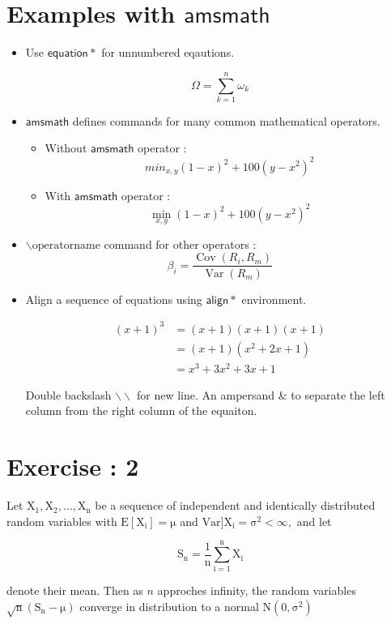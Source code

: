 \documentclass[12pt]{article}
\begin{document}
\section{Examples with $\mathsf{amsmath}$}

\begin{itemize}
\item Use $\mathsf{equation*}$ for unnumbered eqautions.

\begin{equation*}
\Omega = \sum_{k=1}^{n} \omega_k
\end{equation*}

\item $\mathsf{amsmath}$ defines commands for many common mathematical operators.
\begin{itemize}
\item Without $\mathsf{amsmath}$ operator : 
\begin{equation*}
min_{x,y} (1-x)^2 + 100(y-x^2)^2
\end{equation*}
\item With $\mathsf{amsmath}$ operator : 
\begin{equation*}
\min_{x,y} (1-x)^2 + 100(y-x^2)^2
\end{equation*}

\end{itemize}

\item $\backslash \mathrm{operatorname}$ command for other operators : 
\begin{equation*}
\beta_i = 
\frac{\operatorname{Cov}(R_i, R_m)}
{\operatorname{Var}(R_m)}
\end{equation*}

\item Align a sequence of equations using $\mathsf{align*}$ environment.

\begin{align*}
(x+1)^3 &= (x+1)(x+1)(x+1) \\
		  &= (x+1)(x^2 + 2x + 1) \\
        &= x^3 + 3x^2 + 3x + 1
\end{align*}

Double backslash $\backslash \backslash$ for new line. An ampersand \& to separate the left column from the right column of the equaiton.

\end{itemize}


\section{Exercise : 2}

Let $\mathrm{X_1,X_2,\ldots, X_n}$ be a sequence of independent and identically distributed random variables with $\mathrm{E[X_i] = \mu}$ and $\mathrm{Var]X_i = \sigma^2 < \infty},$ and let

\begin{equation*}
\mathrm{S_n = \frac{1}{n} \sum_{i = 1}^{n} X_i}
\end{equation*}

denote their mean. Then as $n$ approches infinity, the random variables $\mathrm{\sqrt{n}(S_n - \mu)}$ converge in distribution to a normal $\mathrm{N(0,\sigma^2)}$
\end{document}
